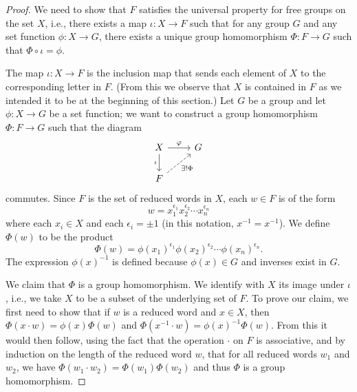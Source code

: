 \begin{proof}
    We need to show that \(F\) satisfies the universal property for free groups
    on the set \(X\), i.e., there exists a map \(\iota: X \to F\) such that for
    any group \(G\) and any set function \(\phi: X \to G\), there exists a
    unique group homomorphism \(\Phi: F \to G\) such that \(\Phi \circ \iota =
    \phi\).

    The map \(\iota: X \to F\) is the inclusion map that sends each element of
    \(X\) to the corresponding letter in \(F\). (From this we observe that \(X\)
    is contained in \(F\) as we intended it to be at the beginning of this
    section.) Let \(G\) be a group and let \(\phi: X \to G\) be a set function;
    we want to construct a group homomorphism \(\Phi: F \to G\) such that the
    diagram
    \[
        \begin{tikzcd}
            X \arrow[d, "\iota"'] \arrow[r, "\phi"] & G \\
            F \arrow[ru, "\exists!\Phi"', dashed]        &  
        \end{tikzcd}
    \]
    commutes. Since \(F\) is the set of reduced words in \(X\), each \(w \in F\)
    is of the form
    \[
        w = x_1^{\epsilon_1} x_2^{\epsilon_2} \cdots x_n^{\epsilon_n}
    \]
    where each \(x_i \in X\) and each \(\epsilon_i = \pm 1\) (in this notation,
    \(x^{-1} = x^{-1}\)). We define \(\Phi(w)\) to be the product
    \[
        \Phi(w) = \phi(x_1)^{\epsilon_1} \phi(x_2)^{\epsilon_2} \cdots \phi(x_n)^{\epsilon_n}.
    \]
    The expression \(\phi(x)^{-1}\) is defined because \(\phi(x) \in G\) and
    inverses exist in \(G\).
    
    We claim that \(\Phi\) is a group homomorphism. We identify with \(X\) its
    image under \(\iota\), i.e., we take \(X\) to be a subset of the underlying
    set of \(F\). To prove our claim, we first need to show that if \(w\) is a
    reduced word and \(x \in X\), then \(\Phi(x\cdot w) = \phi(x)\Phi(w)\) and
    \(\Phi(x^{-1} \cdot w) = \phi(x)^{-1}\Phi(w)\). From this it would then
    follow, using the fact that the operation \(\cdot\) on \(F\) is associative,
    and by induction on the length of the reduced word \(w\), that for all
    reduced words \(w_1\) and \(w_2\), we have \(\Phi(w_1 \cdot w_2) = \Phi(w_1)
    \Phi(w_2)\) and thus \(\Phi\) is a group homomorphism.


\end{proof}
